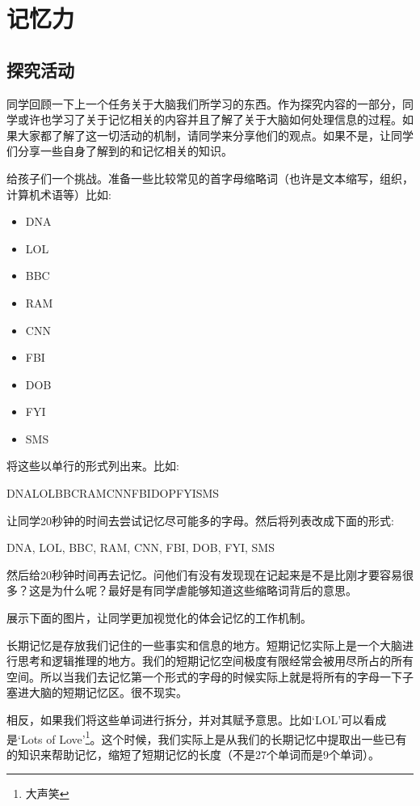 \chapter{记忆力}


\section{探究活动}
    同学回顾一下上一个任务关于大脑我们所学习的东西。作为探究内容的一部分，同学或许也学习了关于记忆相关的内容并且了解了关于大脑如何处理信息的过程。如果大家都了解了这一切活动的机制，请同学来分享他们的观点。如果不是，让同学们分享一些自身了解到的和记忆相关的知识。\par
    给孩子们一个挑战。准备一些比较常见的首字母缩略词（也许是文本缩写，组织，计算机术语等）比如:\par
    \begin{itemize}
      \item DNA 
      \item LOL 
      \item BBC 
      \item RAM 
      \item CNN
      \item FBI 
      \item DOB
      \item FYI
      \item SMS        
    \end{itemize}  
    将这些以单行的形式列出来。比如:\par
    DNALOLBBCRAMCNNFBIDOPFYISMS\par
    让同学20秒钟的时间去尝试记忆尽可能多的字母。然后将列表改成下面的形式:\par
    DNA, LOL, BBC, RAM, CNN, FBI, DOB, FYI, SMS\par
    然后给20秒钟时间再去记忆。问他们有没有发现现在记起来是不是比刚才要容易很多？这是为什么呢？最好是有同学虐能够知道这些缩略词背后的意思。\par
    展示下面的图片，让同学更加视觉化的体会记忆的工作机制。\par
    长期记忆是存放我们记住的一些事实和信息的地方。短期记忆实际上是一个大脑进行思考和逻辑推理的地方。我们的短期记忆空间极度有限经常会被用尽所占的所有空间。所以当我们去记忆第一个形式的字母的时候实际上就是将所有的字母一下子塞进大脑的短期记忆区。很不现实。\par
    相反，如果我们将这些单词进行拆分，并对其赋予意思。比如‘LOL’可以看成是‘Lots of Love’\footnote{大声笑}。这个时候，我们实际上是从我们的长期记忆中提取出一些已有的知识来帮助记忆，缩短了短期记忆的长度（不是27个单词而是9个单词）。\par
